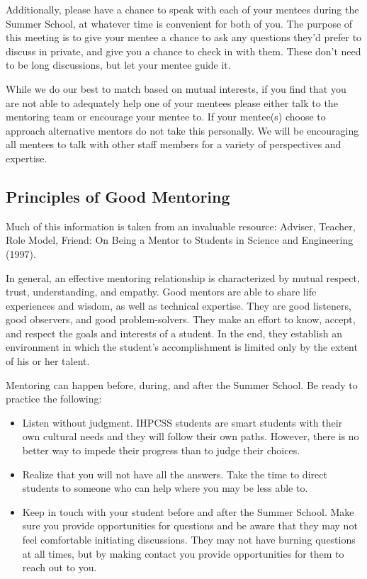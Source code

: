 \documentclass[titlepage]{article}
\begin{document}
Additionally, please have a chance to speak with each of your mentees during the Summer School, at whatever time is convenient for both of you. The purpose of this meeting is to give your mentee a chance to ask any questions they'd prefer to discuss in private, and give you a chance to check in with them. These don't need to be long discussions, but let your mentee guide it.

While we do our best to match based on mutual interests, if you find that you are not able to adequately help one of your mentees please either talk to the mentoring team or encourage your mentee to. If your mentee(s) choose to approach alternative mentors do not take this personally. We will be encouraging all mentees to talk with other staff members for a variety of perspectives and expertise.

\subsection{Principles of Good Mentoring}
\label{sec:org0bfd151}
Much of this information is taken from an invaluable resource: Adviser, Teacher, Role Model, Friend: On Being a Mentor to Students in Science and Engineering (1997).

In general, an effective mentoring relationship is characterized by mutual respect, trust, understanding, and empathy. Good mentors are able to share life experiences and wisdom, as well as technical expertise. They are good listeners, good observers, and good problem-solvers. They make an effort to know, accept, and respect the goals and interests of a student. In the end, they establish an environment in which the student's accomplishment is limited only by the extent of his or her talent.

Mentoring can happen before, during, and after the Summer School. Be ready to practice the following:

\begin{itemize}
\item Listen without judgment. IHPCSS students are smart students with their own cultural needs and they will follow their own paths. However, there is no better way to impede their progress than to judge their choices.
\item Realize that you will not have all the answers. Take the time to direct students to someone who can help where you may be less able to.
\item Keep in touch with your student before and after the Summer School. Make sure you provide opportunities for questions and be aware that they may not feel comfortable initiating discussions. They may not have burning questions at all times, but by making contact you provide opportunities for them to reach out to you.
\end{itemize}
\end{document}
